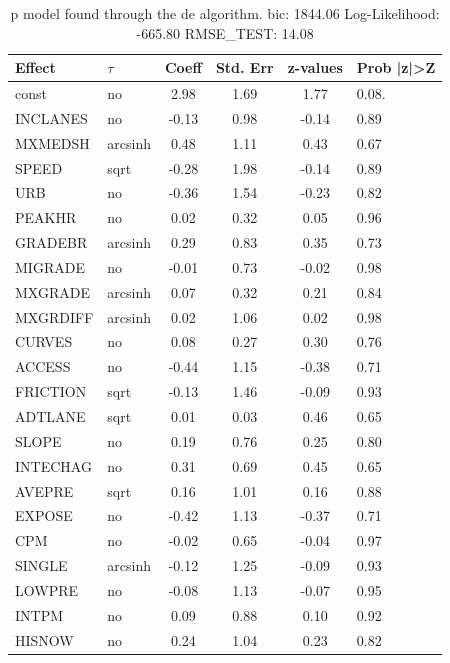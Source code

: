 \begin{table}
	\caption{p model found through the de algorithm. bic: 1844.06 Log-Likelihood: -665.80 RMSE_TEST: 14.08}
	\begin{center}
		\begin{tabular}{|l|l|c|c|c|l|}
			\hline
			Effect & $\tau$ & Coeff & Std. Err & z-values & Prob |z|>Z \\
			\hline
			const & no & 2.98 & 1.69 & 1.77 & 0.08. \\
			\hline
			INCLANES & no & -0.13 & 0.98 & -0.14 & 0.89 \\
			\hline
			MXMEDSH & arcsinh & 0.48 & 1.11 & 0.43 & 0.67 \\
			\hline
			SPEED & sqrt & -0.28 & 1.98 & -0.14 & 0.89 \\
			\hline
			URB & no & -0.36 & 1.54 & -0.23 & 0.82 \\
			\hline
			PEAKHR & no & 0.02 & 0.32 & 0.05 & 0.96 \\
			\hline
			GRADEBR & arcsinh & 0.29 & 0.83 & 0.35 & 0.73 \\
			\hline
			MIGRADE & no & -0.01 & 0.73 & -0.02 & 0.98 \\
			\hline
			MXGRADE & arcsinh & 0.07 & 0.32 & 0.21 & 0.84 \\
			\hline
			MXGRDIFF & arcsinh & 0.02 & 1.06 & 0.02 & 0.98 \\
			\hline
			CURVES & no & 0.08 & 0.27 & 0.30 & 0.76 \\
			\hline
			ACCESS & no & -0.44 & 1.15 & -0.38 & 0.71 \\
			\hline
			FRICTION & sqrt & -0.13 & 1.46 & -0.09 & 0.93 \\
			\hline
			ADTLANE & sqrt & 0.01 & 0.03 & 0.46 & 0.65 \\
			\hline
			SLOPE & no & 0.19 & 0.76 & 0.25 & 0.80 \\
			\hline
			INTECHAG & no & 0.31 & 0.69 & 0.45 & 0.65 \\
			\hline
			AVEPRE & sqrt & 0.16 & 1.01 & 0.16 & 0.88 \\
			\hline
			EXPOSE & no & -0.42 & 1.13 & -0.37 & 0.71 \\
			\hline
			CPM & no & -0.02 & 0.65 & -0.04 & 0.97 \\
			\hline
			SINGLE & arcsinh & -0.12 & 1.25 & -0.09 & 0.93 \\
			\hline
			LOWPRE & no & -0.08 & 1.13 & -0.07 & 0.95 \\
			\hline
			INTPM & no & 0.09 & 0.88 & 0.10 & 0.92 \\
			\hline
			HISNOW & no & 0.24 & 1.04 & 0.23 & 0.82 \\

\end{tabular}
\end{center}
\end{table}
